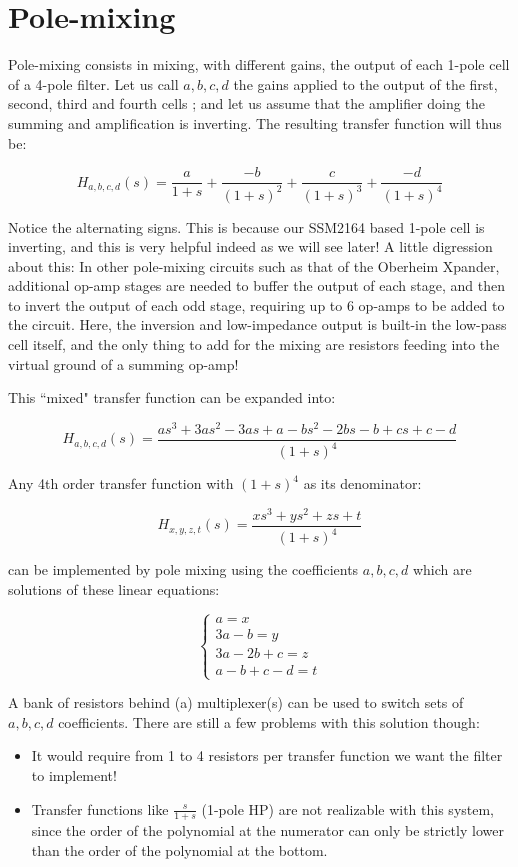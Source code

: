 \documentclass[a4paper,10pt]{article}
\begin{document}
\section{Pole-mixing}

Pole-mixing consists in mixing, with different gains, the output of each 1-pole cell of a 4-pole filter. Let us call $a, b, c, d$ the gains applied to the output of the first, second, third and fourth cells ; and let us assume that the amplifier doing the summing and amplification is inverting. The resulting transfer function will thus be:

$$H_{a, b, c, d}(s) = \frac{a}{1 + s} + \frac{-b}{(1 + s)^2} + \frac{c}{(1 + s)^3} + \frac{-d}{(1 + s)^4}$$

Notice the alternating signs. This is because our SSM2164 based 1-pole cell is inverting, and this is very helpful indeed as we will see later! A little digression about this: In other pole-mixing circuits such as that of the Oberheim Xpander, additional op-amp stages are needed to buffer the output of each stage, and then to invert the output of each odd stage, requiring up to 6 op-amps to be added to the circuit. Here, the inversion and low-impedance output is built-in the low-pass cell itself, and the only thing to add for the mixing are resistors feeding into the virtual ground of a summing op-amp!

This ``mixed" transfer function can be expanded into:

$$H_{a, b, c, d}(s) = \frac{a s^3 + 3as^2-3as + a - b s^2 - 2bs - b + cs +c - d}{(1 + s)^4}$$

Any 4th order transfer function with $(1 + s)^4$ as its denominator:

$$H_{x, y, z, t}(s) = \frac{x s^3 + y s^2 + z s + t}{(1 + s)^4}$$

can be implemented by pole mixing using the coefficients $a, b, c, d$ which are solutions of these linear equations:

$$\left\{\begin{array}{c}
a = x \\
3a - b = y \\ 
3a - 2b + c = z \\
a - b + c - d = t
\end{array}\right.$$

A bank of resistors behind (a) multiplexer(s) can be used to switch sets of $a, b, c, d$ coefficients. There are still a few problems with this solution though:

\begin{itemize}
\item It would require from 1 to 4 resistors per transfer function we want the filter to implement!
\item Transfer functions like $\frac{s}{1 + s}$ (1-pole HP) are not realizable with this system, since the order of the polynomial at the numerator can only be strictly lower than the order of the polynomial at the bottom.
\end{itemize}
\end{document}
